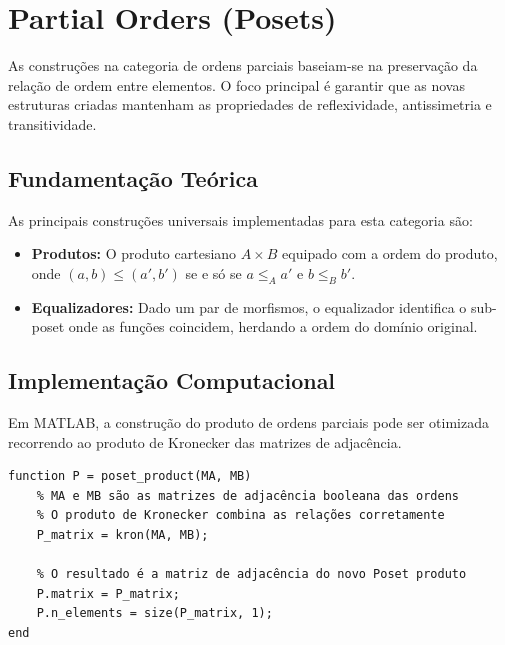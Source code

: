 \section{Partial Orders (Posets)}

As construções na categoria de ordens parciais baseiam-se na preservação da relação de ordem entre elementos. O foco principal é garantir que as novas estruturas criadas mantenham as propriedades de reflexividade, antissimetria e transitividade.

\subsection{Fundamentação Teórica}
As principais construções universais implementadas para esta categoria são:
\begin{itemize}
    \item \textbf{Produtos:} O produto cartesiano $A \times B$ equipado com a ordem do produto, onde $(a,b) \le (a',b')$ se e só se $a \le_A a'$ e $b \le_B b'$.
    \item \textbf{Equalizadores:} Dado um par de morfismos, o equalizador identifica o sub-poset onde as funções coincidem, herdando a ordem do domínio original.
\end{itemize}

\subsection{Implementação Computacional}
Em MATLAB, a construção do produto de ordens parciais pode ser otimizada recorrendo ao produto de Kronecker das matrizes de adjacência.

\begin{lstlisting}[caption={Construção do Produto de Posets}]
function P = poset_product(MA, MB)
    % MA e MB são as matrizes de adjacência booleana das ordens
    % O produto de Kronecker combina as relações corretamente
    P_matrix = kron(MA, MB);
    
    % O resultado é a matriz de adjacência do novo Poset produto
    P.matrix = P_matrix;
    P.n_elements = size(P_matrix, 1);
end
\end{lstlisting}